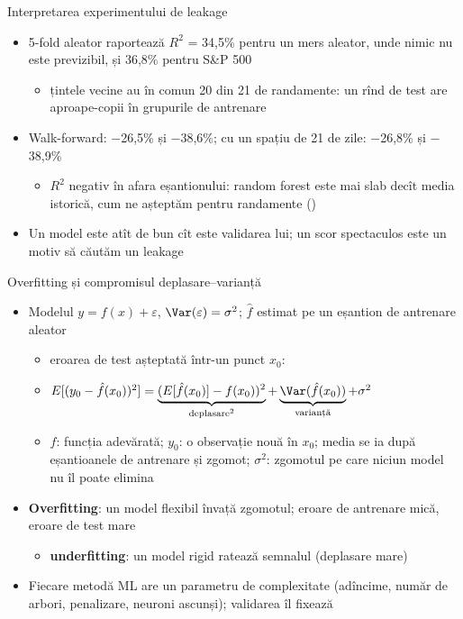 \begin{frame}{Interpretarea experimentului de leakage}
\itemsize{\small}
\begin{itemize}
    \item 5-fold aleator raportează $R^2$ = 34{,}5\% pentru un mers aleator, unde nimic nu este previzibil, și 36{,}8\% pentru S\&P 500
    \begin{itemize}
        \item țintele vecine au în comun 20 din 21 de randamente: un rînd de test are aproape-copii în grupurile de antrenare
    \end{itemize}
    \item Walk-forward: $-$26{,}5\% și $-$38{,}6\%; cu un spațiu de 21 de zile: $-$26{,}8\% și $-$38{,}9\%
    \begin{itemize}
        \item $R^2$ negativ în afara eșantionului: random forest este mai slab decît media istorică, cum ne așteptăm pentru randamente ()
    \end{itemize}
    \item Un model este atît de bun cît este validarea lui; un scor spectaculos este un motiv să căutăm un leakage
\end{itemize}
\end{frame}

\begin{frame}{Overfitting și compromisul deplasare--varianță}
\itemsize{\small}
\begin{itemize}
    \item Modelul $y = f(x) + \varepsilon$, $\Var(\varepsilon) = \sigma^2$; $\hat f$ estimat pe un eșantion de antrenare aleator
    \begin{itemize}
        \item eroarea de test așteptată într-un punct $x_0$:
        \item $E[(y_0 - \hat f(x_0))^2] = \underbrace{(E[\hat f(x_0)] - f(x_0))^2}_{\text{deplasare}^2} + \underbrace{\Var(\hat f(x_0))}_{\text{varianță}} + \sigma^2$
        \item $f$: funcția adevărată; $y_0$: o observație nouă în $x_0$; media se ia după eșantioanele de antrenare și zgomot; $\sigma^2$: zgomotul pe care niciun model nu îl poate elimina
    \end{itemize}
    \item \textbf{Overfitting}: un model flexibil învață zgomotul; eroare de antrenare mică, eroare de test mare
    \begin{itemize}
        \item \textbf{underfitting}: un model rigid ratează semnalul (deplasare mare)
    \end{itemize}
    \item Fiecare metodă ML are un parametru de complexitate (adîncime, număr de arbori, penalizare, neuroni ascunși); validarea îl fixează
\end{itemize}
\end{frame}

